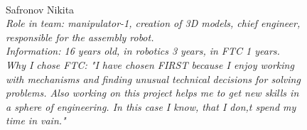 \begin{figure}[H]
	\vfill
	\begin{minipage}{0.47\linewidth}
		\\
	\end{minipage}
	\hfill
	\begin{minipage}{0.47\linewidth}
		Safronov Nikita\\
		\emph{Role in team: manipulator-1,  creation of 3D models, chief engineer, responsible for the assembly robot.\\}
		\emph{Information: 16 years old, in robotics 3 years, in FTC 1 years.\\} 
		\emph{Why I chose FTC: "I have chosen FIRST because I enjoy working with mechanisms and finding unusual technical decisions for solving problems. Also working on this project helps me to get new skills in a sphere of engineering. In this case I know, that I don,t spend my time in vain."}				
	\end{minipage}
\end{figure}

